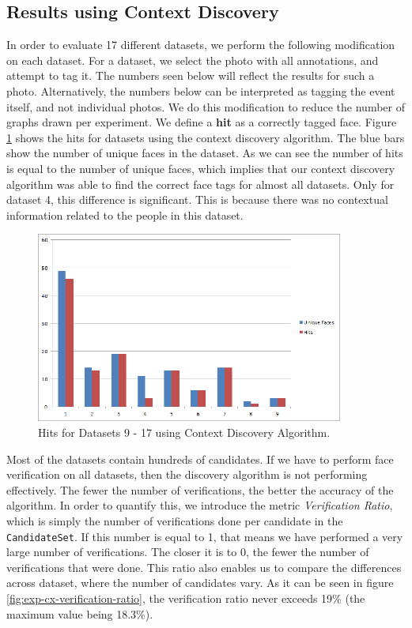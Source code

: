 \subsection{Results using Context Discovery}
In order to evaluate 17 different datasets, we perform the following modification on each dataset. For a dataset, we select the photo with all annotations, and attempt to tag it. The numbers seen below will reflect the results for such a photo. Alternatively, the numbers below can be interpreted as tagging the event itself, and not individual photos. We do this modification to reduce the number of graphs drawn per experiment. We define a \textbf{hit} as a correctly tagged face. Figure \ref{fig:exp-cx-hits} shows the hits for datasets using the context discovery algorithm. The blue bars show the number of unique faces in the dataset. As we can see the number of hits is equal to the number of unique faces, which implies that our context discovery algorithm was able to find the correct face tags for almost all datasets. Only for dataset 4, this difference is significant. This is because there was no contextual information related to the people in this dataset.

\begin{figure}[h]
\centering
\includegraphics[width=0.9\textwidth]{media/chapter5/cx-unique-faces-hits.png}
\caption{Hits for Datasets 9 - 17 using Context Discovery Algorithm.}
\label{fig:exp-cx-hits}
\end{figure}

Most of the datasets contain hundreds of candidates. If we have to perform face verification on all datasets, then the discovery algorithm is not performing effectively. The fewer the number of verifications, the better the accuracy of the algorithm. In order to quantify this, we introduce the metric \textit{Verification Ratio}, which is simply the number of verifications done per candidate in the \texttt{CandidateSet}. If this number is equal to 1, that means we have performed a very large number of verifications. The closer it is to 0, the fewer the number of verifications that were done. This ratio also enables us to compare the differences across dataset, where the number of candidates vary. As it can be seen in figure \ref{fig:exp-cx-verification-ratio}, the verification ratio never exceeds 19\% (the maximum value being 18.3\%).

